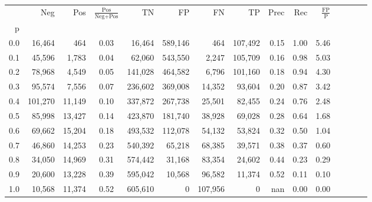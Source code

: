 \begin{tabular}{rrrcrrrrrrrrrrr}
\toprule
{} &      Neg &     Pos & $\frac{\text{Pos}}{\text{Neg}+\text{Pos}}$ &       TN &       FP &       FN &       TP &  Prec &   Rec & $\frac{\text{FP}}{\text{P}}$ \\
p   &          &         &                                            &          &          &          &          &       &       &                              \\
\midrule
0.0 &   16,464 &     464 &                                       0.03 &   16,464 &  589,146 &      464 &  107,492 &  0.15 &  1.00 &                         5.46 \\
0.1 &   45,596 &   1,783 &                                       0.04 &   62,060 &  543,550 &    2,247 &  105,709 &  0.16 &  0.98 &                         5.03 \\
0.2 &   78,968 &   4,549 &                                       0.05 &  141,028 &  464,582 &    6,796 &  101,160 &  0.18 &  0.94 &                         4.30 \\
0.3 &   95,574 &   7,556 &                                       0.07 &  236,602 &  369,008 &   14,352 &   93,604 &  0.20 &  0.87 &                         3.42 \\
0.4 &  101,270 &  11,149 &                                       0.10 &  337,872 &  267,738 &   25,501 &   82,455 &  0.24 &  0.76 &                         2.48 \\
0.5 &   85,998 &  13,427 &                                       0.14 &  423,870 &  181,740 &   38,928 &   69,028 &  0.28 &  0.64 &                         1.68 \\
0.6 &   69,662 &  15,204 &                                       0.18 &  493,532 &  112,078 &   54,132 &   53,824 &  0.32 &  0.50 &                         1.04 \\
0.7 &   46,860 &  14,253 &                                       0.23 &  540,392 &   65,218 &   68,385 &   39,571 &  0.38 &  0.37 &                         0.60 \\
0.8 &   34,050 &  14,969 &                                       0.31 &  574,442 &   31,168 &   83,354 &   24,602 &  0.44 &  0.23 &                         0.29 \\
0.9 &   20,600 &  13,228 &                                       0.39 &  595,042 &   10,568 &   96,582 &   11,374 &  0.52 &  0.11 &                         0.10 \\
1.0 &   10,568 &  11,374 &                                       0.52 &  605,610 &        0 &  107,956 &        0 &   nan &  0.00 &                         0.00 \\
\bottomrule
\end{tabular}
